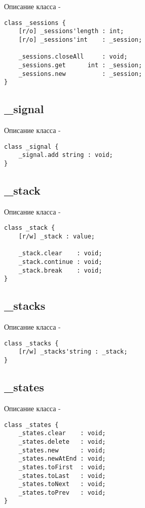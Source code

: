 \noindent Описание класса  -
\begin{lstlisting}[numbers=none]
class _sessions {
	[r/o] _sessions'length : int;
	[r/o] _sessions'int    : _session;
	
	_sessions.closeAll     : void;
	_sessions.get      int : _session;
	_sessions.new          : _session;
}
\end{lstlisting}

\subsection{{\color{orange} \_signal}}

\noindent Описание класса  -
\begin{lstlisting}[numbers=none]
class _signal {
	_signal.add string : void;
}
\end{lstlisting}

\subsection{{\color{orange} \_stack}}

\noindent Описание класса  -
\begin{lstlisting}[numbers=none]
class _stack {
	[r/w] _stack : value;
	
	_stack.clear    : void;
	_stack.continue : void;
	_stack.break    : void;
}
\end{lstlisting}

\subsection{{\color{orange} \_stacks}}

\noindent Описание класса  -
\begin{lstlisting}[numbers=none]
class _stacks {
	[r/w] _stacks'string : _stack;
}
\end{lstlisting}

\subsection{{\color{orange} \_states}}

\noindent Описание класса  -
\begin{lstlisting}[numbers=none]
class _states {
	_states.clear    : void;
	_states.delete   : void;
	_states.new      : void;
	_states.newAtEnd : void;
	_states.toFirst  : void;
	_states.toLast   : void;
	_states.toNext   : void;
	_states.toPrev   : void;
}
\end{lstlisting}

